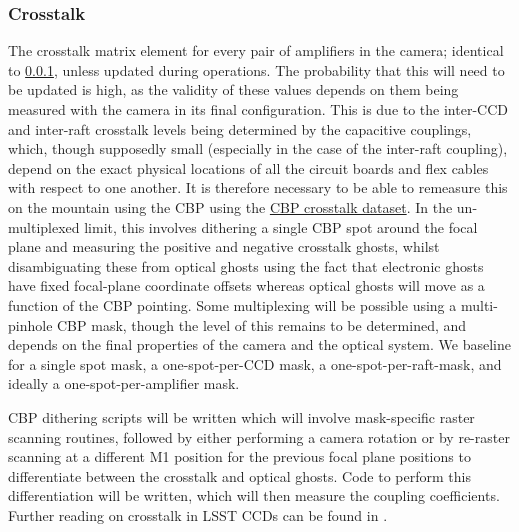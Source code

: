 \subsubsection{Crosstalk}\label{sec:CPP:output:crosstalk}
The crosstalk matrix element for every pair of amplifiers in the camera; identical to \secsymbol\ref{sec:CPP:output:crosstalk}, unless updated during operations. The probability that this will need to be updated is high, as the validity of these values depends on them being measured with the camera in its final configuration. This is due to the inter-CCD and inter-raft crosstalk levels being determined by the capacitive couplings, which, though supposedly small (especially in the case of the inter-raft coupling), depend on the exact physical locations of all the circuit boards and flex cables with respect to one another. It is therefore necessary to be able to remeasure this on the mountain using the CBP using the \hyperref[sec:CPP:inputs:CBP:crosstalk]{CBP crosstalk dataset}.
\alg In the un-multiplexed limit, this involves dithering a single CBP spot around the focal plane and measuring the positive and negative crosstalk ghosts, whilst disambiguating these from optical ghosts using the fact that electronic ghosts have fixed focal-plane coordinate offsets whereas optical ghosts will move as a function of the CBP pointing. Some multiplexing will be possible using a multi-pinhole CBP mask, though the level of this remains to be determined, and depends on the final properties of the camera and the optical system. We baseline for a single spot mask, a one-spot-per-CCD mask, a one-spot-per-raft-mask, and ideally a one-spot-per-amplifier mask.

CBP dithering scripts will be written which will involve mask-specific raster scanning routines, followed by either performing a camera rotation or by re-raster scanning at a different M1 position for the previous focal plane positions to differentiate between the crosstalk and optical ghosts. Code to perform this differentiation will be written, which will then measure the coupling coefficients. Further reading on crosstalk in LSST CCDs can be found in \cite{2015JInst..10C5010O}.

